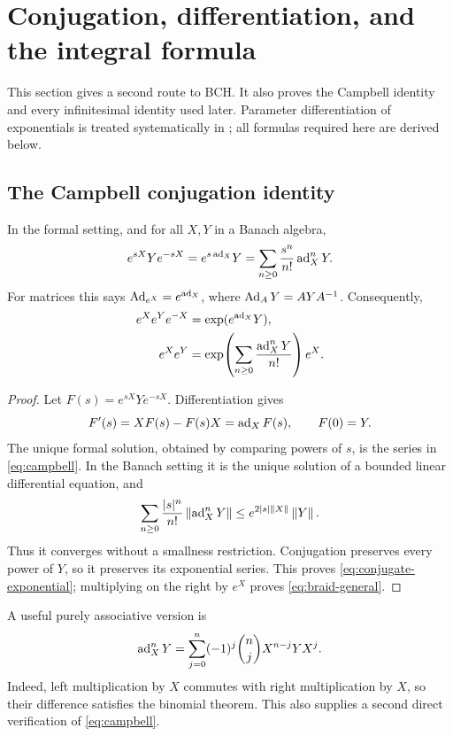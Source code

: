 \section{Conjugation, differentiation, and the integral formula}\label{sec:differential}
This section gives a second route to BCH. It also proves the Campbell identity and every infinitesimal identity used later. Parameter differentiation of exponentials is treated systematically in \cite{Wilcox}; all formulas required here are derived below.

\subsection{The Campbell conjugation identity}
\begin{theorem}\label{thm:campbell}
In the formal setting, and for all $X,Y$ in a Banach algebra,
\begin{equation}\label{eq:campbell}
 e^{sX}Ye^{-sX}=e^{s\operatorname{ad}_X}Y
 =\sum_{n\geq0}\frac{s^n}{n!}\operatorname{ad}_X^nY.
\end{equation}
For matrices this says $\operatorname{Ad}_{e^X}=e^{\operatorname{ad}_X}$, where $\operatorname{Ad}_A Y=AYA^{-1}$. Consequently,
\begin{align}
 e^Xe^Ye^{-X}&=\exp(e^{\operatorname{ad}_X}Y),\label{eq:conjugate-exponential}\\
 e^Xe^Y&=\exp\!\left(\sum_{n\geq0}\frac{\operatorname{ad}_X^nY}{n!}\right)e^X.\label{eq:braid-general}
\end{align}
\end{theorem}
\begin{proof}
Let $F(s)=e^{sX}Ye^{-sX}$. Differentiation gives
\[
 F'(s)=XF(s)-F(s)X=\operatorname{ad}_X F(s),\qquad F(0)=Y.
\]
The unique formal solution, obtained by comparing powers of $s$, is the series in \cref{eq:campbell}. In the Banach setting it is the unique solution of a bounded linear differential equation, and
\[
 \sum_{n\geq0}\frac{|s|^n}{n!}\left\lVert \operatorname{ad}_X^nY\right\rVert
 \leq e^{2|s|\left\lVert X\right\rVert}\left\lVert Y\right\rVert.
\]
Thus it converges without a smallness restriction. Conjugation preserves every power of $Y$, so it preserves its exponential series. This proves \cref{eq:conjugate-exponential}; multiplying on the right by $e^X$ proves \cref{eq:braid-general}.
\end{proof}
A useful purely associative version is
\begin{equation}\label{eq:ad-binomial}
 \operatorname{ad}_X^nY=\sum_{j=0}^{n}(-1)^j\binom nj X^{n-j}YX^j.
\end{equation}
Indeed, left multiplication by $X$ commutes with right multiplication by $X$, so their difference satisfies the binomial theorem. This also supplies a second direct verification of \cref{eq:campbell}.

